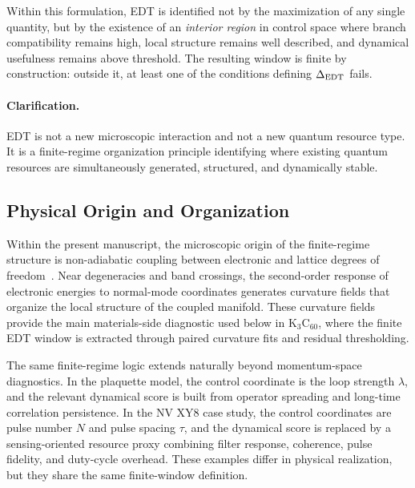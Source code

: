\documentclass[twocolumn,10pt]{article}
\begin{document}
Within this formulation, EDT is identified not by the maximization of any single quantity, but by the existence of an \emph{interior region} in control space where branch compatibility remains high, local structure remains well described, and dynamical usefulness remains above threshold. The resulting window is finite by construction: outside it, at least one of the conditions defining $\Delta_{\rm EDT}$ fails.

\paragraph*{Clarification.}

EDT is not a new microscopic interaction and not a new quantum resource type. It is a finite-regime organization principle identifying where existing quantum resources are simultaneously generated, structured, and dynamically stable.

\subsection{Physical Origin and Organization}

Within the present manuscript, the microscopic origin of the finite-regime structure is non-adiabatic coupling between electronic and lattice degrees of freedom~\cite{Mead1979,Yarkony1996,Giustino2017}. Near degeneracies and band crossings, the second-order response of electronic energies to normal-mode coordinates generates curvature fields that organize the local structure of the coupled manifold. These curvature fields provide the main materials-side diagnostic used below in K$_3$C$_{60}$, where the finite EDT window is extracted through paired curvature fits and residual thresholding.

The same finite-regime logic extends naturally beyond momentum-space diagnostics. In the plaquette model, the control coordinate is the loop strength $\lambda$, and the relevant dynamical score is built from operator spreading and long-time correlation persistence. In the NV XY8 case study, the control coordinates are pulse number $N$ and pulse spacing $\tau$, and the dynamical score is replaced by a sensing-oriented resource proxy combining filter response, coherence, pulse fidelity, and duty-cycle overhead. These examples differ in physical realization, but they share the same finite-window definition.
\end{document}
